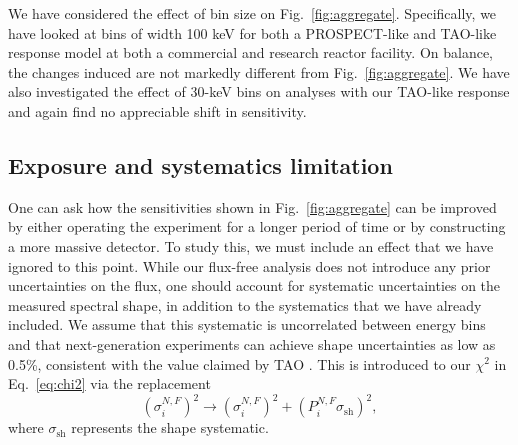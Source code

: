 \documentclass[prd, twocolumn, tightenlines, twoside, secnumarabic, superscriptaddress, preprintnumbers, nofootinbib, notitlepage]{revtex4-1}
\begin{document}
We have considered the effect of bin size on Fig.~\ref{fig:aggregate}. Specifically, we have looked at bins of width 100 keV for both a PROSPECT-like and TAO-like response model at both a commercial and research reactor facility. On balance, the changes induced are not markedly different from Fig.~\ref{fig:aggregate}. We have also investigated the effect of 30-keV bins on analyses with our TAO-like response and again find no appreciable shift in sensitivity.

\subsection{Exposure and systematics limitation}
\label{sec:exposure}

One can ask how the sensitivities shown in Fig.~\ref{fig:aggregate} can be improved by either operating the experiment for a longer period of time or by constructing a more massive detector. To study this, we must include an effect that we have ignored to this point. While our flux-free analysis does not introduce any prior uncertainties on the flux, one should account for systematic uncertainties on the measured spectral shape, in addition to the systematics that we have already included. We assume that this systematic is uncorrelated between energy bins and that next-generation experiments can achieve shape uncertainties as low as 0.5\%, consistent with the value claimed by TAO \cite{Abusleme:2020bzt}. This is introduced to our $\chi^2$ in Eq.~\eqref{eq:chi2} via the replacement
\begin{equation}
    \left(\sigma^{N,F}_i\right)^2 \to \left(\sigma^{N,F}_i\right)^2 + (P_i^{N,F} \sigma_\text{sh})^2,
\end{equation}
where $\sigma_\text{sh}$ represents the shape systematic.
\end{document}
